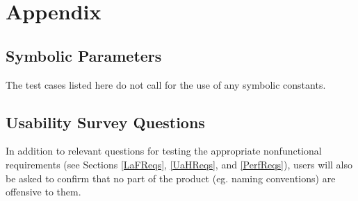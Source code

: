 \documentclass[12pt, titlepage]{article}
\begin{document}
%

\newpage

\section{Appendix}

\subsection{Symbolic Parameters}

The test cases listed here do not call for the use of any symbolic constants.

\subsection{Usability Survey Questions}

In addition to relevant questions for testing the appropriate nonfunctional requirements (see Sections \ref{LaFReqs}, \ref{UaHReqs}, and \ref{PerfReqs}), users will also be asked to confirm that no part of the product (eg. naming conventions) are offensive to them.
\end{document}
